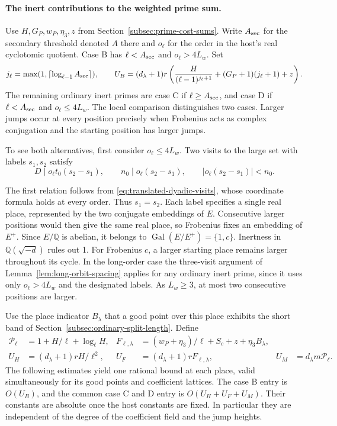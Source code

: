 \paragraph{The inert contributions to the weighted prime sum.}
\label{sec:cut-length-rows}
Use \(H,G_P,w_P,\eta_3,z\) from
Section~\ref{subsec:prime-cost-sums}. Write \(A_{\rm sec}\) for
the secondary threshold denoted \(A\) there and \(o_\ell\) for
the order in the host's real cyclotomic quotient. Case B has
\(\ell<A_{\rm sec}\) and \(o_\ell>4L_w\). Set
\[
 j_\ell=\max(1,\lceil\log_{\ell-1}A_{\rm sec}\rceil),\qquad
 U_B=(d_\lambda+1)r
     \left(\frac{H}{(\ell-1)^{j_\ell+1}}+
          (G_P+1)(j_\ell+1)+z\right).
\]
The remaining ordinary inert primes are case C if
\(\ell\ge A_{\rm sec}\), and case D if \(\ell<A_{\rm sec}\) and
\(o_\ell\le4L_w\). The local comparison distinguishes two
cases. Larger jumps occur at every position precisely when
Frobenius acts as complex conjugation and the starting
position has larger jumps.

To see both alternatives, first consider \(o_\ell\le4L_w\).
Two visits to the large set with labels \(s_1,s_2\) satisfy
\[
 D\mid o_\ell t_0(s_2-s_1),\qquad
 n_0\mid o_\ell(s_2-s_1),\qquad
 |o_\ell(s_2-s_1)|<n_0 .
\]

The first relation follows from \eqref{eq:translated-dyadic-visits},
whose coordinate formula holds at every order. Thus \(s_1=s_2\).
Each label specifies a single real place, represented by the two
conjugate embeddings of \(E\). Consecutive larger positions would
then give the same real place, so Frobenius fixes an embedding of
\(E^+\). Since \(E/\mathbb Q\) is abelian, it belongs to
\(\operatorname{Gal}(E/E^+)=\{1,c\}\). Inertness in
\(\mathbb Q(\sqrt{-d})\) rules out 1. For Frobenius \(c\),
a larger starting place remains larger throughout its cycle.
In the long-order case the three-visit argument of
Lemma~\ref{lem:long-orbit-spacing} applies for any ordinary inert
prime, since it uses only \(o_\ell>4L_w\) and the designated
labels. As \(L_w\ge3\), at most two consecutive positions are larger.

Use the place indicator \(B_\lambda\)
that a good point over this place exhibits the short band of
Section~\ref{subsec:ordinary-split-length}. Define
\[
\begin{aligned}
 \mathcal P_\ell&=1+H/\ell+\log_\ell H,&
 F_{\ell,\lambda}&=(w_P+\eta_3)/\ell+S_c+z+\eta_3B_\lambda,\\
 U_H&=(d_\lambda+1)rH/\ell^2,&
 U_F&=(d_\lambda+1)r F_{\ell,\lambda},&
 U_M&=d_\lambda m\mathcal P_\ell .
\end{aligned}
\]
The following estimates yield one rational bound at each place,
valid simultaneously for its good points and coefficient lattices.
The case B entry is \(O(U_B)\), and the common case C and D
entry is \(O(U_H+U_F+U_M)\). Their constants are absolute once
the host constants are fixed. In particular they are independent of
the degree of the coefficient field and the jump heights.
\label{cor:inert-row-lengths-2}

